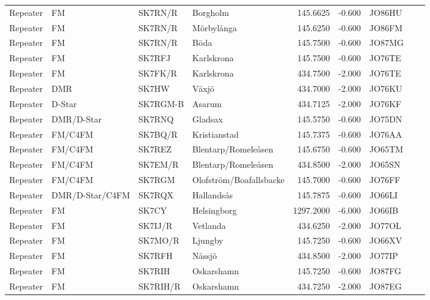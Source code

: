 \begin{longtable}{llllrrlcl}
	Repeater & FM              & SK7RN/R  & Borgholm                &   145.6625 &   -0.600 & JO86HU &  \\
	Repeater & FM              & SK7RN/R  & Mörbylånga              &   145.6250 &   -0.600 & JO86FM &  \\
	Repeater & FM              & SK7RN/R  & Böda                    &   145.7500 &   -0.600 & JO87MG &  \\
	Repeater & FM              & SK7RFJ   & Karlskrona              &   145.7500 &   -0.600 & JO76TE &  \\
	Repeater & FM              & SK7FK/R  & Karlskrona              &   434.7500 &   -2.000 & JO76TE &  \\
	Repeater & DMR             & SK7HW    & Växjö                   &   434.7000 &   -2.000 & JO76KU &  \\
	Repeater & D-Star          & SK7RGM-B & Asarum                  &   434.7125 &   -2.000 & JO76KF &  \\
	Repeater & DMR/D-Star      & SK7RNQ   & Gladsax                 &   145.5750 &   -0.600 & JO75DN &  \\
	Repeater & FM/C4FM         & SK7BQ/R  & Kristianstad            &   145.7375 &   -0.600 & JO76AA &  \\
	Repeater & FM/C4FM         & SK7REZ   & Blentarp/Romeleåsen     &   145.6750 &   -0.600 & JO65TM &  \\
	Repeater & FM/C4FM         & SK7EM/R  & Blentarp/Romeleåsen     &   434.8500 &   -2.000 & JO65SN &  \\
	Repeater & FM/C4FM         & SK7RGM   & Olofström/Boafallsbacke &   145.7000 &   -0.600 & JO76FF &  \\
	Repeater & DMR/D-Star/C4FM & SK7RQX   & Hallandsås              &   145.7875 &   -0.600 & JO66LI &  \\
	Repeater & FM              & SK7CY    & Helsingborg             &  1297.2000 &   -6.000 & JO66IB &  \\
	Repeater & FM              & SK7IJ/R  & Vetlanda                &   434.6250 &   -2.000 & JO77OL &  \\
	Repeater & FM              & SK7MO/R  & Ljungby                 &   145.7250 &   -0.600 & JO66XV &  \\
	Repeater & FM              & SK7RFH   & Nässjö                  &   434.8500 &   -2.000 & JO77IP &  \\
	Repeater & FM              & SK7RIH   & Oskarshamn              &   145.7250 &   -0.600 & JO87FG &  \\
	Repeater & FM              & SK7RIH/R & Oskarshamn              &   434.7250 &   -2.000 & JO87EG &  \\

\end{longtable}
